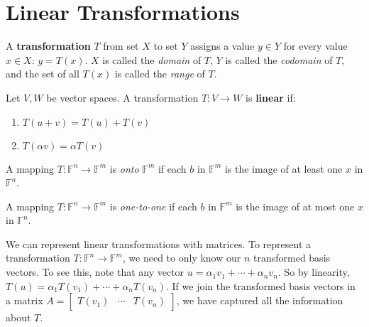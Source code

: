 \section{Linear Transformations}
\begin{definition}
A \textbf{transformation} $T$ from set $X$ to set $Y$ assigns a value $y \in Y$ for every value $x \in X$: $y = T(x)$. $X$ is called the \textit{domain} of $T$, $Y$ is called the \textit{codomain} of $T$, and the set of all $T(x)$ is called the \textit{range} of $T$. 

Let $V, W$ be vector spaces. A transformation $T: V \rightarrow W$ is \textbf{linear} if:
\begin{enumerate}
	\item $T(u + v) = T(u) + T(v)$
	\item $T(\alpha v) = \alpha T(v)$
\end{enumerate}

A mapping $T: \mathbb{F}^{n} \rightarrow \mathbb{F}^{m}$ is \textit{onto} $\mathbb{F}^{m}$ if each $b$ in $\mathbb{F}^{m}$ is the image of at least one $x$ in $\mathbb{F}^{n}$. 

A mapping $T: \mathbb{F}^{n} \rightarrow \mathbb{F}^{m}$ is \textit{one-to-one} if each $b$ in $\mathbb{F}^{m}$ is the image of at most one $x$ in $\mathbb{F}^{n}$. 
\end{definition}

We can represent linear transformations with matrices. To represent a transformation $T: \mathbb{F}^{n} \rightarrow \mathbb{F}^{m}$, we need to only know our $n$ transformed basis vectors. To see this, note that any vector $u = \alpha_{1} v_{1} + \cdots + \alpha_{n} v_{n}$. So by linearity, $T(u) = \alpha_{1} T(v_{1}) + \cdots + \alpha_{n} T(v_{n})$. If we join the transformed basis vectors in a matrix $A = \begin{bmatrix}
T(v_{1}) & \cdots & T(v_{n})
\end{bmatrix}$, we have captured all the information about $T$. 

